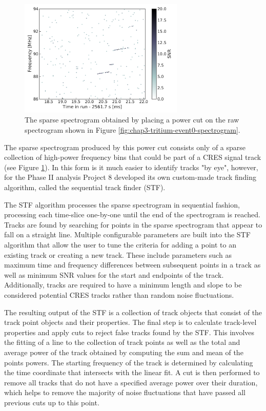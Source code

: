 \begin{figure}[htbp]
    \centering
    \includegraphics*[width=0.7\textwidth]{figs/Chapter-3/230621_t_event_zero_sparse_spectrogram_zoom.pdf}
    \caption{\label{fig:chap3-sparse-spectrogram} The sparse spectrogram obtained by placing a power cut on the raw spectrogram shown in Figure \ref{fig:chap3-tritium-event0-spectrogram}.}
\end{figure}

The sparse spectrogram produced by this power cut consists only of a sparse collection of high-power frequency bins that could be part of a CRES signal track (see Figure \ref{fig:chap3-sparse-spectrogram}). In this form is it much easier to identify tracks "by eye", however, for the Phase II analysis Project 8 developed its own custom-made track finding algorithm, called the sequential track finder (STF). 

The STF algorithm processes the sparse spectrogram in sequential fashion, processing each time-slice one-by-one until the end of the spectrogram is reached. Tracks are found by searching for points in the sparse spectrogram that appear to fall on a straight line. Multiple configurable parameters are built into the STF algorithm that allow the user to tune the criteria for adding a point to an existing track or creating a new track. These include parameters such as maximum time and frequency differences between subsequent points in a track as well as minimum SNR values for the start and endpoints of the track. Additionally, tracks are required to have a minimum length and slope to be considered potential CRES tracks rather than random noise fluctuations. 

The resulting output of the STF is a collection of track objects that consist of the track point objects and their properties. The final step is to calculate track-level properties and apply cuts to reject false tracks found by the STF. This involves the fitting of a line to the collection of track points as well as the total and average power of the track obtained by computing the sum and mean of the points powers. The starting frequency of the track is determined by calculating the time coordinate that  intersects with the linear fit. A cut is then performed to remove all tracks that do not have a specified average power over their duration, which helps to remove the majority of noise fluctuations that have passed all previous cuts up to this point.

